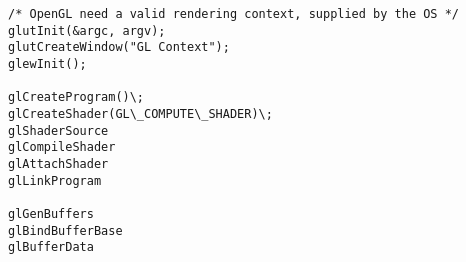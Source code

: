 \lstset{language=C++}
\begin{lstlisting}
/* OpenGL need a valid rendering context, supplied by the OS */
glutInit(&argc, argv);
glutCreateWindow("GL Context");
glewInit();

glCreateProgram()\;
glCreateShader(GL\_COMPUTE\_SHADER)\;
glShaderSource
glCompileShader
glAttachShader
glLinkProgram

glGenBuffers
glBindBufferBase
glBufferData
\end{lstlisting}